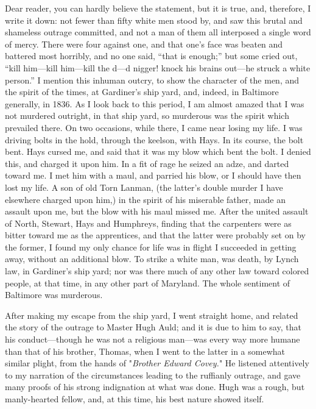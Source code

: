 Dear reader, you can hardly believe the statement, but it is true, and,
therefore, I write it down: not fewer than fifty white men stood by, and
saw this brutal and shameless outrage committed, and not a man of them
all interposed a single word of mercy. There were four against one, and
that one's face was beaten and battered most horribly, and no one said,
``that is enough;'' but some cried out, ``kill him---kill him---kill the
d---d nigger! knock his brains out---he struck a white person.'' I
mention this inhuman outcry, to show the character of the men, and the
spirit of the times, at Gardiner's ship yard, and, indeed, in Baltimore
generally, in 1836. As I look back to this period, I am almost amazed
that I was not murdered outright, in that ship yard, so murderous was
the spirit which prevailed there. On two occasions, while there, I came
near losing my life. I was driving bolts in the hold, through the
keelson, with Hays. In its course, the bolt bent. Hays cursed me, and
said that it was my blow which bent the bolt. I denied this, and charged
it upon him. In a fit of rage he seized an adze, and darted toward me. I
met him with a maul, and parried his blow, or I should have then lost my
life. A son of old Torn Lanman, (the latter's double murder I have
elsewhere charged upon him,) in the spirit of his miserable father, made
an assault upon me, but the blow with his maul missed me. After the
united assault of North, Stewart, Hays and Humphreys, finding that the
{\protect\hypertarget{315}{}{}}carpenters were as bitter toward me as
the apprentices, and that the latter were probably set on by the former,
I found my only chance for life was in flight I succeeded in getting
away, without an additional blow. To strike a white man, was death, by
Lynch law, in Gardiner's ship yard; nor was there much of any other law
toward colored people, at that time, in any other part of Maryland. The
whole sentiment of Baltimore was murderous.

After making my escape from the ship yard, I went straight home, and
related the story of the outrage to Master Hugh Auld; and it is due to
him to say, that his conduct---though he was not a religious man---was
every way more humane than that of his brother, Thomas, when I went to
the latter in a somewhat similar plight, from the hands of
"\emph{Brother Edward Covey.}" He listened attentively to my narration
of the circumstances leading to the ruffianly outrage, and gave many
proofs of his strong indignation at what was done. Hugh was a rough, but
manly-hearted fellow, and, at this time, his best nature showed itself.

